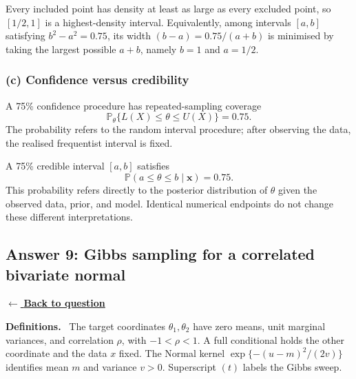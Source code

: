 \documentclass[11pt,a4paper]{article}
\newcommand{\given}{\mathrel{|}}
\newcommand{\xvec}{\boldsymbol{x}}
\newcommand{\answernav}[1]{%
  \label{answer:#1}%
  \noindent\hyperref[question:#1]{$\leftarrow$ \textbf{Back to question}}%
  \par\smallskip}
\newcommand{\studyheading}[1]{%
  \par\medskip\noindent\textcolor{statblue}{\textbf{#1.}}\ }
\begin{document}
\begin{center}
\end{center}

Every included point has density at least as large as every excluded point,
so $[1/2,1]$ is a highest-density interval. Equivalently, among intervals
$[a,b]$ satisfying $b^2-a^2=0.75$, its width
$(b-a)=0.75/(a+b)$ is minimised by taking the largest possible $a+b$, namely
$b=1$ and $a=1/2$.

\subsubsection*{(c) Confidence versus credibility}

A 75\% confidence procedure has repeated-sampling coverage
\[
  \mathbb{P}_{\theta}\{L(X)\leq\theta\leq U(X)\}=0.75.
\]
The probability refers to the random interval procedure; after observing the
data, the realised frequentist interval is fixed.

A 75\% credible interval $[a,b]$ satisfies
\[
  \mathbb{P}(a\leq\theta\leq b\given\xvec)=0.75.
\]
This probability refers directly to the posterior distribution of $\theta$
given the observed data, prior, and model. Identical numerical endpoints do
not change these different interpretations.

\clearpage

\subsection{Answer 9: Gibbs sampling for a correlated bivariate normal}
\answernav{9}

\studyheading{Definitions}
The target coordinates $\theta_1,\theta_2$ have zero means, unit marginal variances, and correlation $\rho$, with $-1<\rho<1$.
A full conditional holds the other coordinate and the data $x$ fixed.
The Normal kernel $\exp\{-(u-m)^2/(2v)\}$ identifies mean $m$ and variance $v>0$.
Superscript $(t)$ labels the Gibbs sweep.
\end{document}
